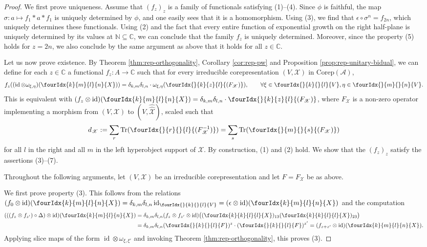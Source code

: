\documentclass[10pt]{article}
\DeclareMathOperator{\id}{id}
\newcommand{\dualco}[1]{\hat{#1}}
\newcommand{\Corep}{\mathrm{Corep}}
\newcommand{\C}{\mathbb{C}}
\newcommand{\N}{\mathbb{N}}
\newcommand{\Tr}{\mathrm{Tr}}
\newcommand{\Gr}[5]{\fourIdx{#2}{#4}{#3}{#5}{#1}}%
\newcommand{\Gru}[3]{\Gr{#1}{}{}{#2}{#3}}
\theoremstyle{definition}
\numberwithin{equation}{section}
\begin{document}
\begin{proof}
  We first prove uniqueness.  Assume that $(f_{z})_{z}$ is a family of
  functionals satisfying (1)--(4).  Since $\phi$ is faithful, the map
  $\sigma\colon a \mapsto f_{1} \ast a \ast f_{1}$ is uniquely
  determined by $\phi$, and one easily sees that it is a homomorphism. Using
  (3), we find that $\epsilon \circ \sigma^n=f_{2n}$, which uniquely determines these functionals. Using (2) and the
  fact that every entire function of exponential growth on the right
  half-plane is uniquely determined by its values at $\N \subseteq \C$, we can conclude that the family $f_{z}$ is uniquely determined. Moreover, since the property (5) holds for $z = 2n$, we also conclude by the same argument as above that it holds for all $z\in \C$.

  Let us now prove existence.  By Theorem \ref{thm:rep-orthogonality}, Corollary \ref{cor:rep-pw} and Proposition \ref{prop:rep-unitary-bidual}, we can
  define for each $z\in \C$ a functional $f_{z} \colon A \to \C$ such
  that for every 
  irreducible  corepresentation
  $(V,\mathscr{X})$ in $\Corep(\mathscr{A})$, \[ f_{z}((\id \otimes \omega_{\xi,\eta})(\Gr{X}{k}{l}{m}{n})) =
      \delta_{k,m}\delta_{l,n} \cdot
      \omega_{\xi,\eta}(\Gr{(F_{{\mathscr{X}}})}{}{z}{k}{l}), \qquad \forall \xi \in \Gru{V}{k}{l},\eta \in
      \Gru{V}{m}{n}.\] This is equivalent with $(f_{z} \otimes \id)(\Gr{X}{k}{l}{m}{n}) =
      \delta_{k,m}\delta_{l,n} \cdot \Gr{(F_{{\mathscr{X}}})}{}{z}{k}{l}$, 
    where $F_{\mathscr{X}}$ is a non-zero operator implementing a morphism from $(V,\mathscr{X})$ to
    $(V, \dualco{\dualco{\mathscr{X}}})$, scaled such that
    \[d_{\mathscr{X}}:= \sum_{r} \Tr(\Gru{(F_{\mathscr{X}}^{-1})}{r}{l}) = \sum_{s}
      \Tr(\Gru{(F_{\mathscr{X}})}{m}{s})\]
    for all $l$ in the right and all $m$ in the left hyperobject support of $\mathscr{X}$. By
    construction, (1) and (2) hold. We show that the $(f_{z})_{z}$ satisfy the
    assertions (3)--(7). 

        Throughout the following arguments, let 
    $(V,\mathscr{X})$ be an  irreducible corepresentation
 and let $F=F_{\mathscr{X}}$ be as above.

    We first prove property (3). This follows from the relations $(f_{0}  \otimes \id)(\Gr{X}{k}{l}{m}{n}) =
      \delta_{k,m}\delta_{l,n} \id_{\Gru{V}{k}{l}} =
      (\epsilon \otimes \id)(\Gr{X}{k}{l}{m}{n})$ and the computation
    \begin{align*}
      (((f_{z}\otimes f_{z'})\circ \Delta) \otimes
      \id)(\Gr{X}{k}{l}{m}{n}) &=  \delta_{k,m}\delta_{l,n}(f_{z} \otimes f_{z'} \otimes
      \id)\big((\Gr{X}{k}{l}{k}{l})_{13}
      (\Gr{X}{k}{l}{k}{l})_{23}\big) \\
      &=  \delta_{k,m}\delta_{l,n}(\Gru{F}{k}{l})^{z}  \cdot (\Gru{F}{k}{l})^{z'} = (f_{z+z'} \otimes \id)(\Gr{X}{k}{l}{m}{n}).
    \end{align*}
    Applying slice maps of the form $\id
    \otimes \omega_{\xi,\xi'}$ and invoking Theorem \ref{thm:rep-orthogonality}, this proves (3).


\end{proof}
\end{document}
